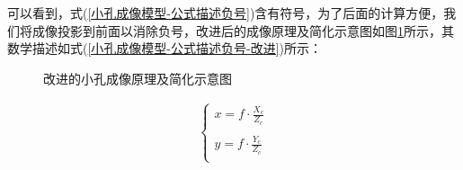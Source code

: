\documentclass{article}
\begin{document}
可以看到，式(\ref{小孔成像模型-公式描述负号})含有符号，为了后面的计算方便，我们将成像投影到前面以消除负号，改进后的成像原理及简化示意图如图\ref{小孔成像原理及简化示意图-改进}所示，其数学描述如式(\ref{小孔成像模型-公式描述负号-改进})所示：
\begin{figure}[H]
	\centering  %
	\caption{改进的小孔成像原理及简化示意图}    %
	\label{小孔成像原理及简化示意图-改进}    %
\end{figure}
	\begin{gather}
	\left\{ \begin{array}{c}
		x=f\cdot \frac{X_c}{Z_c}\\
		\\
		y=f\cdot \frac{Y_c}{Z_c}\\
	\end{array} \right. 	\label{小孔成像模型-公式描述负号-改进}
\end{gather}
\end{document}
